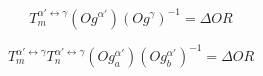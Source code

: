 $$T_{m}^{\alpha'\leftrightarrow\gamma}\left(Og^{\alpha'}\right)\left(Og^{\gamma}\right)^{-1}=\Delta OR\label{eq:1}$$

$$T_{m}^{\alpha'\leftrightarrow\gamma}T_{n}^{\alpha'\leftrightarrow\gamma}\left(Og_{a}^{\alpha'}\right)\left(Og_{b}^{\alpha'}\right)^{-1}=\Delta OR\label{eq:2}$$
